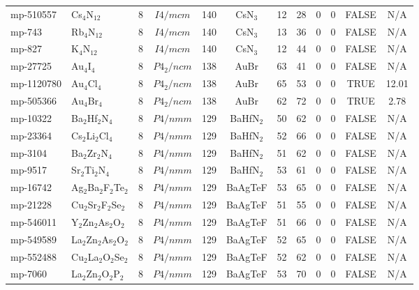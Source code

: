 {\begin{longtable}{llcccccccccc}
    mp-510557 & Cs$_{4}$N$_{12}$ & 8     & $I4/mcm$ & 140   & CsN$_{3}$ & 12    & 28    & 0     & 0     & FALSE & N/A \\
    mp-743 & Rb$_{4}$N$_{12}$ & 8     & $I4/mcm$ & 140   & CsN$_{3}$ & 13    & 36    & 0     & 0     & FALSE & N/A \\
    mp-827 & K$_{4}$N$_{12}$ & 8     & $I4/mcm$ & 140   & CsN$_{3}$ & 12    & 44    & 0     & 0     & FALSE & N/A \\
    mp-27725 & Au$_{4}$I$_{4}$ & 8     & $P4_2/ncm$ & 138   & AuBr  & 63    & 41    & 0     & 0     & FALSE & N/A \\
    mp-1120780 & Au$_{4}$Cl$_{4}$ & 8     & $P4_2/ncm$ & 138   & AuBr  & 65    & 53    & 0     & 0     & TRUE  & 12.01  \\
    mp-505366 & Au$_{4}$Br$_{4}$ & 8     & $P4_2/ncm$ & 138   & AuBr  & 62    & 72    & 0     & 0     & TRUE  & 2.78  \\
    mp-10322 & Ba$_{2}$Hf$_{2}$N$_{4}$ & 8     & $P4/nmm$ & 129   & BaHfN$_{2}$ & 50    & 62    & 0     & 0     & FALSE & N/A \\
    mp-23364 & Cs$_{2}$Li$_{2}$Cl$_{4}$ & 8     & $P4/nmm$ & 129   & BaHfN$_{2}$ & 52    & 66    & 0     & 0     & FALSE & N/A \\
    mp-3104 & Ba$_{2}$Zr$_{2}$N$_{4}$ & 8     & $P4/nmm$ & 129   & BaHfN$_{2}$ & 51    & 62    & 0     & 0     & FALSE & N/A \\
    mp-9517 & Sr$_{2}$Ti$_{2}$N$_{4}$ & 8     & $P4/nmm$ & 129   & BaHfN$_{2}$ & 53    & 61    & 0     & 0     & FALSE & N/A \\
    mp-16742 & Ag$_{2}$Ba$_{2}$F$_{2}$Te$_{2}$ & 8     & $P4/nmm$ & 129   & BaAgTeF & 53    & 65    & 0     & 0     & FALSE & N/A \\
    mp-21228 & Cu$_{2}$Sr$_{2}$F$_{2}$Se$_{2}$ & 8     & $P4/nmm$ & 129   & BaAgTeF & 51    & 55    & 0     & 0     & FALSE & N/A \\
    mp-546011 & Y$_{2}$Zn$_{2}$As$_{2}$O$_{2}$ & 8     & $P4/nmm$ & 129   & BaAgTeF & 51    & 66    & 0     & 0     & FALSE & N/A \\
    mp-549589 & La$_{2}$Zn$_{2}$As$_{2}$O$_{2}$ & 8     & $P4/nmm$ & 129   & BaAgTeF & 52    & 65    & 0     & 0     & FALSE & N/A \\
    mp-552488 & Cu$_{2}$La$_{2}$O$_{2}$Se$_{2}$ & 8     & $P4/nmm$ & 129   & BaAgTeF & 52    & 62    & 0     & 0     & FALSE & N/A \\
    mp-7060 & La$_{2}$Zn$_{2}$O$_{2}$P$_{2}$ & 8     & $P4/nmm$ & 129   & BaAgTeF & 53    & 70    & 0     & 0     & FALSE & N/A \\

\end{longtable}}
